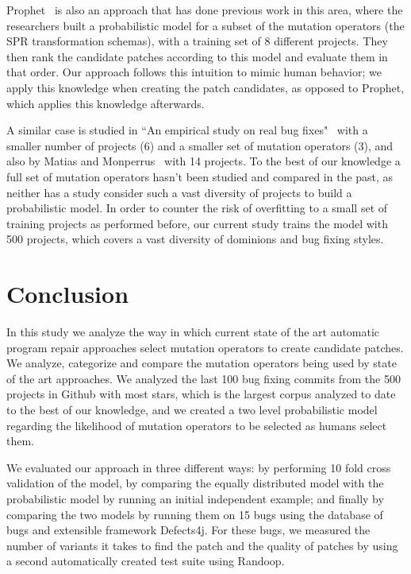 \documentclass[conference]{IEEEtran}
\begin{document}
{Prophet~\cite{long15} is also an approach that has done previous work in this 
area, where the researchers built a 
probabilistic model for a subset of the mutation operators (the SPR transformation schemas), with a training set 
of 8 different projects. They then rank the candidate patches according to this model and evaluate them in that order. Our approach follows this intuition to mimic human behavior; we apply this knowledge when creating the patch candidates, as opposed to Prophet, which applies this knowledge afterwards. 

A similar case is studied in ``An empirical study on 
real bug fixes"~\cite{zhong15} with a smaller number of projects (6) and a 
smaller set of 
mutation operators (3), and also by Matias and Monperrus~\cite{matias15} with 14 
projects. To the best of our knowledge a full set of mutation 
operators hasn't been studied and compared in the past, as neither has a study 
consider such a vast diversity of projects to build a probabilistic model. In 
order to counter the 
risk of overfitting to a small set of training projects as performed before, our 
current study trains the model with 500 projects, which covers a vast diversity 
of dominions and bug fixing styles.


\section{Conclusion} \label{conclusion}
In this study we analyze the way in which current state of the art automatic 
program repair approaches select mutation operators to create candidate 
patches. We analyze, categorize and compare the mutation operators being used by 
state of the art approaches. We analyzed the last 100 bug fixing commits from the
500 projects in Github with most stars, which is the largest corpus analyzed to date
to the best of our knowledge, and we created a two level probabilistic model regarding 
the likelihood of mutation operators to be selected as humans select them.

We evaluated our approach in three different ways: by performing 10 fold cross 
validation of the model, by comparing the equally distributed model with the probabilistic model by running an initial independent example; and finally by  comparing the two models by running them on 15 bugs using the database of bugs and extensible 
framework Defects4j. For these bugs, we measured the number of variants it takes to find the patch and the quality of patches by using a second automatically created test suite using Randoop. 

}
\end{document}

